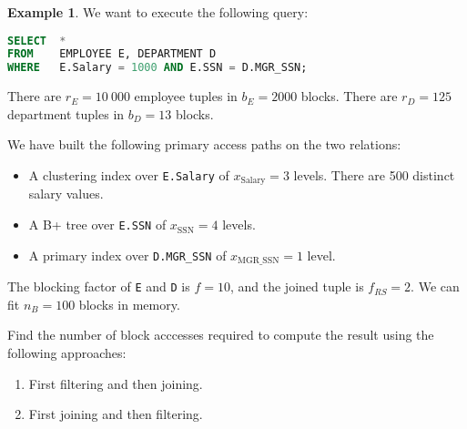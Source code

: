 \documentclass[a4paper, openany]{memoir}
\theoremstyle{definition}
\newtheorem{example}[subsection]{Example}
\begin{document}
\begin{example}
    We want to execute the following query:
\begin{lstlisting}[language=SQL]
SELECT  *
FROM    EMPLOYEE E, DEPARTMENT D
WHERE   E.Salary = 1000 AND E.SSN = D.MGR_SSN;
\end{lstlisting}
    There are $r_E = 10 \ 000$ employee tuples in $b_E = 2000$ blocks. There are $r_D = 125$ department tuples in $b_D = 13$ blocks. 

    We have built the following primary access paths on the two relations:
    \begin{itemize}
        \item A clustering index over \texttt{E.Salary} of $x_{\text{Salary}} = 3$ levels. There are 500 distinct salary values.
        \item A B+ tree over \texttt{E.SSN} of $x_{\text{SSN}} = 4$ levels.
        \item A primary index over \texttt{D.MGR\_SSN}  of $x_{\text{MGR\_SSN}} = 1$ level.
    \end{itemize}
    The blocking factor of \texttt{E} and \texttt{D} is $f = 10$, and the joined tuple is $f_{RS} = 2$. We can fit $n_B = 100$ blocks in memory. 

    Find the number of block acccesses required to compute the result using the following approaches:
    \begin{enumerate}
        \item First filtering and then joining.
        \item First joining and then filtering.
    \end{enumerate}
\end{example}
\end{document}
